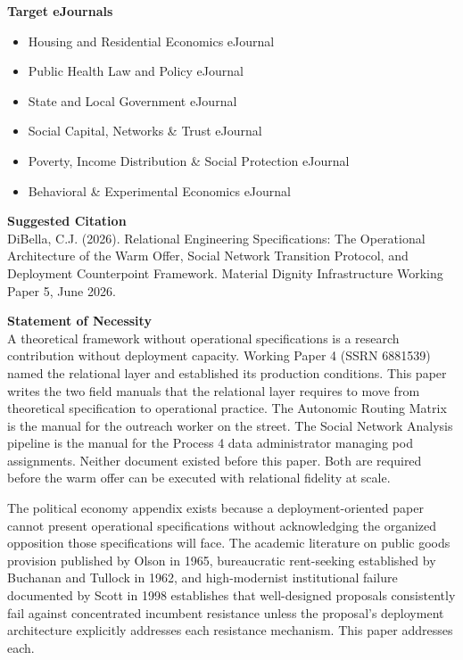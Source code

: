 \documentclass[12pt, letterpaper]{article}
\begin{document}
\vspace{8pt}
\noindent\textbf{Target eJournals}
\begin{itemize}[nosep, before={\vspace{-8pt}}, leftmargin=2em]
    \item Housing and Residential Economics eJournal
    \item Public Health Law and Policy eJournal
    \item State and Local Government eJournal
    \item Social Capital, Networks \& Trust eJournal
    \item Poverty, Income Distribution \& Social Protection eJournal
    \item Behavioral \& Experimental Economics eJournal
\end{itemize}

\vspace{8pt}
\noindent\textbf{Suggested Citation}\\[1pt]
DiBella, C.J. (2026). Relational Engineering Specifications: The Operational Architecture of the Warm Offer, Social Network Transition Protocol, and Deployment Counterpoint Framework. Material Dignity Infrastructure Working Paper 5, June 2026.

\newpage

\vspace{8pt}
\noindent\textbf{Statement of Necessity}\\[1pt]
A theoretical framework without operational specifications is a research contribution without deployment capacity. Working Paper 4 (SSRN 6881539) named the relational layer and established its production conditions. This paper writes the two field manuals that the relational layer requires to move from theoretical specification to operational practice. The Autonomic Routing Matrix is the manual for the outreach worker on the street. The Social Network Analysis pipeline is the manual for the Process 4 data administrator managing pod assignments. Neither document existed before this paper. Both are required before the warm offer can be executed with relational fidelity at scale.

The political economy appendix exists because a deployment-oriented paper cannot present operational specifications without acknowledging the organized opposition those specifications will face. The academic literature on public goods provision published by Olson in 1965, bureaucratic rent-seeking established by Buchanan and Tullock in 1962, and high-modernist institutional failure documented by Scott in 1998 establishes that well-designed proposals consistently fail against concentrated incumbent resistance unless the proposal's deployment architecture explicitly addresses each resistance mechanism. This paper addresses each.
\end{document}
